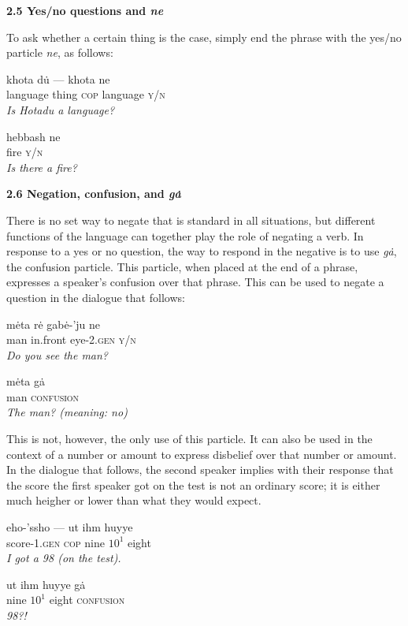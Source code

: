 \documentclass{article}[10pt]
\begin{document}
{\bf 2.5 Yes/no questions and \emph{ne}}

To ask whether a certain thing is the case, simply end the phrase with the yes/no particle \emph{ne}, as follows:
\begin{exe}
\ex
\gll khota d\.{u} --- khota ne\\
language thing \textsc{cop} language \textsc{y/n}\\
\trans \emph{Is Hotadu a language?}

\ex 
\gll hebbash ne\\
fire \textsc{y/n}\\
\trans \emph{Is there a fire?}
\end{exe}

{\bf 2.6 Negation, confusion, and \emph{g\.{a}}}

There is no set way to negate that is standard in all situations, but different functions of the language can together play the role of negating a verb. In response to a yes or no question, the way to respond in the negative is to use \emph{g\.{a}}, the confusion particle. This particle, when placed at the end of a phrase, expresses a speaker's confusion over that phrase. This can be used to negate a question in the dialogue that follows:
\begin{exe}
\ex 
\gll m\.{e}ta r\.{e} gab\.{e}-'ju ne\\
man in.front eye-\textsc{2.gen} \textsc{y/n}\\
\trans \emph{Do you see the man?}

\ex
\gll m\.{e}ta g\.{a}\\
man \textsc{confusion}\\
\trans \emph{The man? (meaning: no)}
\end{exe}

This is not, however, the only use of this particle. It can also be used in the context of a number or amount to express disbelief over that number or amount. In the dialogue that follows, the second speaker implies with their response that the score the first speaker got on the test is not an ordinary score; it is either much heigher or lower than what they would expect.
\begin{exe}
\ex 
\gll eho-'ssho --- ut ihm huyye\\
score-\textsc{1.gen} \textsc{cop} nine $10^1$ eight\\
\trans \emph{I got a 98 (on the test).}

\ex
\gll ut ihm huyye g\.{a}\\
nine $10^1$ eight \textsc{confusion}\\
\trans \emph{98?!}
\end{exe}
\end{document}
